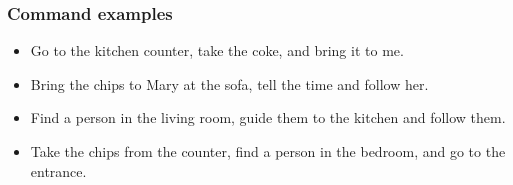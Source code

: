 \subsubsection{Command examples}
\begin{itemize}
	\item Go to the kitchen counter, take the coke, and bring it to me.
	\item Bring the chips to Mary at the sofa, tell the time and follow her.
	\item Find a person in the living room, guide them to the kitchen and follow them.
	\item Take the chips from the counter, find a person in the bedroom, and go to the entrance.
\end{itemize}

